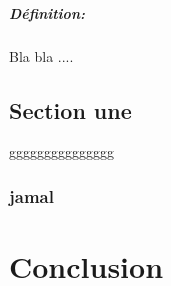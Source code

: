 \documentclass[12pt, a4paper, openany]{report}
\begin{document}
 \paragraph{Définition:}
  Bla bla ....

 \section{Section une}
  ggggggggggggggg
  \subsection{jamal}

\chapter*{Conclusion}
 

  
\end{document}
